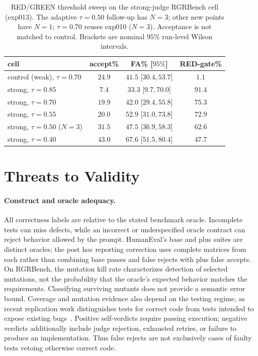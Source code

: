 \begin{table}[t]
\centering
\caption{RED/GREEN threshold sweep on the strong-judge RGRBench cell (exp013).
The adaptive $\tau{=}0.50$ follow-up has $N{=}3$; other new points have $N{=}1$;
$\tau{=}0.70$ reuses exp010 ($N{=}3$). Acceptance is not matched to control.
Brackets are nominal $95\%$ run-level Wilson intervals.}
\label{tab:tausweep}
\small
\begin{tabular}{lccc}
\toprule
cell & accept\% & FA\% [$95\%$] & RED-gate\% \\
\midrule
control (weak), $\tau{=}0.70$      & $24.9$ & $41.5$ [$30.4, 53.7$] & $1.1$  \\
strong, $\tau{=}0.85$              & $7.4$  & $33.3$ [$9.7, 70.0$]  & $91.4$ \\
strong, $\tau{=}0.70$              & $19.9$ & $42.0$ [$29.4, 55.8$] & $75.3$ \\
strong, $\tau{=}0.55$              & $20.0$ & $52.9$ [$31.0, 73.8$] & $72.9$ \\
strong, $\tau{=}0.50$ ($N{=}3$)    & $31.5$ & $47.5$ [$36.9, 58.3$] & $62.6$ \\
strong, $\tau{=}0.40$              & $43.0$ & $67.6$ [$51.5, 80.4$] & $47.7$ \\
\bottomrule
\end{tabular}
\end{table}





\section{Threats to Validity}
\label{sec:threats}

\paragraph{Construct and oracle adequacy.} All correctness labels are relative to the stated
benchmark oracle. Incomplete tests can miss defects, while an incorrect or underspecified oracle
contract can reject behavior allowed by the prompt. HumanEval's base and plus suites are distinct
oracles; the post hoc reporting correction uses complete matrices from each rather than combining
base passes and false rejects with plus false accepts. On RGRBench, the mutation kill rate
characterizes detection of selected mutations, not the probability that the oracle's expected
behavior matches the requirements. Classifying surviving mutants does not provide a semantic
error bound. Coverage and mutation evidence also depend on the testing regime, as recent
replication work distinguishes tests for correct code from tests intended to expose existing
bugs~\cite{zhao2026coverage}. Positive self-verdicts require passing execution; negative verdicts additionally
include judge rejection, exhausted retries, or failure to produce an implementation. Thus false
rejects are not exclusively cases of faulty tests vetoing otherwise correct code.


